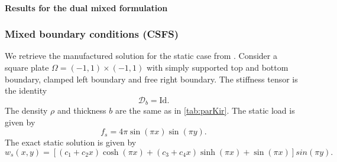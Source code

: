 \paragraph{Results for the dual mixed formulation}


\subsubsection{Mixed boundary conditions (CSFS)}

We retrieve the manufactured solution for the static case from \cite{rafetseder2018siam}. Consider a square plate $\Omega = (-1,1)\times (-1,1)$ with simply supported top and  bottom boundary, clamped left boundary and free right boundary. The stiffness tensor is the identity
\begin{equation*}
\bm{\mathcal{D}}_b = \mathrm{Id}.
\end{equation*} 
The density $\rho$ and thickness $b$ are the same as in \ref{tab:parKir}.
The static load is given by
\begin{equation*}
f_s = 4 \pi \sin(\pi x) \sin(\pi y).
\end{equation*}
The exact static solution is given by
\begin{equation*}
w_s(x, y) = [(c_1 + c_2 x) \cosh(\pi x) + (c_3 + c_4 x) \sinh(\pi x) + \sin(\pi x)] sin(\pi y).
\end{equation*}

